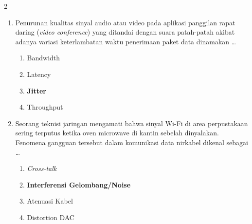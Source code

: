 \documentclass[10pt,a4paper]{article}
\begin{document}
\begin{multicols}{2}
\begin{enumerate}
    \item Penurunan kualitas sinyal audio atau video pada aplikasi panggilan rapat daring (\emph{video conference}) yang ditandai dengan suara patah-patah akibat adanya variasi keterlambatan waktu penerimaan paket data dinamakan \dots
    \begin{enumerate}
        \item Bandwidth
        \item Latency
        \item \textbf{Jitter}
        \item Throughput
    \end{enumerate}

    \item Seorang teknisi jaringan mengamati bahwa sinyal Wi-Fi di area perpustakaan sering terputus ketika oven microwave di kantin sebelah dinyalakan. Fenomena gangguan tersebut dalam komunikasi data nirkabel dikenal sebagai \dots
    \begin{enumerate}
        \item \emph{Cross-talk}
        \item \textbf{Interferensi Gelombang/Noise}
        \item Atenuasi Kabel
        \item Distortion DAC
    \end{enumerate}
\end{enumerate}

\end{multicols}
\end{document}
